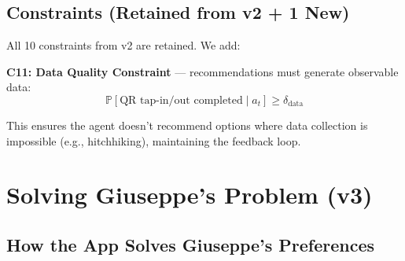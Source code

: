 \documentclass[11pt,a4paper]{article}
\begin{document}
\subsection{Constraints (Retained from v2 + 1 New)}

All 10 constraints from v2 are retained. We add:

\textbf{C11: Data Quality Constraint} --- recommendations must generate observable data:
\begin{equation}
    \mathbb{P}[\text{QR tap-in/out completed} \mid a_t] \geq \delta_{\text{data}}
\end{equation}

This ensures the agent doesn't recommend options where data collection is impossible (e.g., hitchhiking), maintaining the feedback loop.

\section{Solving Giuseppe's Problem (v3)}
\label{sec:giuseppe}

\subsection{How the App Solves Giuseppe's Preferences}
\end{document}

